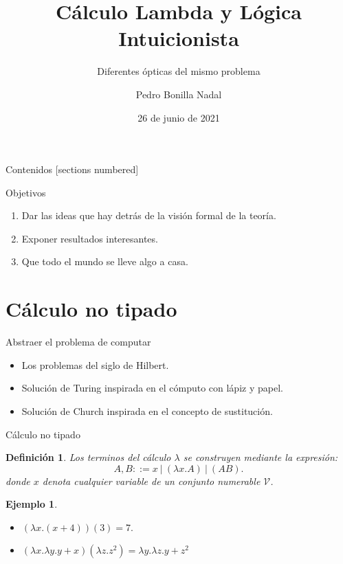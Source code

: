 \documentclass[usenames,dvipsnames]{beamer}
\title{Cálculo Lambda y Lógica Intuicionista}
\subtitle{Diferentes ópticas del mismo problema}
\date{26 de junio de 2021}
\institute{EsLibre 2021}
\author{Pedro Bonilla Nadal}
\newtheorem{definicion}{Definición}
\newtheorem{ejemplo}{Ejemplo}
\begin{document}
\maketitle
\begin{frame}{Contenidos}
  [sections numbered]
  \tableofcontents [hideallsubsections]
\end{frame}
\begin{frame}{Objetivos}
  \begin{enumerate}
  \item Dar las ideas que hay detrás de la visión formal de la teoría.
  \item Exponer resultados interesantes.
  \item Que todo el mundo se lleve algo a casa.
  \end{enumerate}
\end{frame}
\section{Cálculo no tipado}
\begin{frame}{Abstraer el problema de computar}
  \begin{itemize}
  \item Los problemas del siglo de Hilbert.
  \item Solución de Turing inspirada en el cómputo con lápiz y papel.
  \item Solución de Church inspirada en el concepto de sustitución.
  \end{itemize}
\end{frame}

\begin{frame}{Cálculo no tipado}
  \begin{definicion}
    Los terminos del cálculo $\lambda$ se construyen mediante la expresión:
    $$A,B ::= x\ |\ (\lambda x.A)\ |\ (AB) .$$
    donde $x$ denota cualquier variable de un conjunto numerable $\mathcal{V}$.
  \end{definicion}
  \begin{ejemplo}
    \begin{itemize}
    \item $(\lambda x.(x+4)) (3) = 7.$
    \item $(\lambda x.\lambda y. y+x)(\lambda z. z^2) = \lambda y. \lambda z. y+z^2 $
    \end{itemize}
  \end{ejemplo}
\end{frame}
\end{document}
